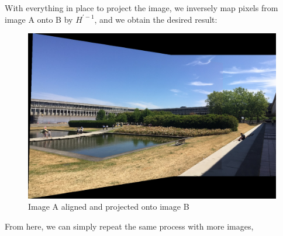 \documentclass[]{article}
\begin{document}
With everything in place to project the image, we inversely map pixels from image A onto B by  $H^{\prime-1}$, and we obtain the desired result:

\begin{figure}[h]
	\includegraphics[scale=0.23]{results/p1_noblend/4}
	\centering
	\caption{Image A aligned and projected onto image B}
\end{figure}

From here, we can simply repeat the same process with more images,
\end{document}
